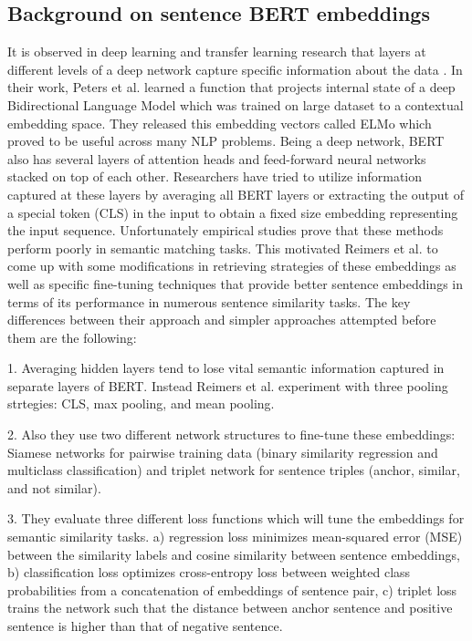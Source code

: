 \subsection{Background on sentence BERT embeddings}
It is observed in deep learning and transfer learning research that layers at different levels of a deep network capture specific information about the data \cite{peters2018dissecting}. In their work, Peters et al. \cite{peters2018deep} learned a function that projects internal state of a deep Bidirectional Language Model which was trained on large dataset to a contextual embedding space. They released this embedding vectors called ELMo which proved to be useful across many NLP problems. Being a deep network, BERT \cite{devlin2018bert} also has several layers of attention heads and feed-forward neural networks stacked on top of each other. Researchers have tried to utilize information captured at these layers by averaging all BERT layers \cite{zhang2019bertscore} or extracting the output of a special token (CLS) in the input \cite{may2019measuring}\cite{qiao2019understanding} to obtain a fixed size embedding representing the input sequence. Unfortunately empirical studies prove that these methods perform poorly in semantic matching tasks. This motivated Reimers et al. \cite{reimers2019sentence} to come up with some modifications in retrieving strategies of these embeddings as well as specific fine-tuning techniques that provide better sentence embeddings in terms of its performance in numerous sentence similarity tasks. The key differences between their approach and simpler approaches attempted before them are the following:

1. Averaging hidden layers tend to lose vital semantic information captured in separate layers of BERT. Instead Reimers et al. experiment with three pooling strtegies: CLS, max pooling, and mean pooling. 

2. Also they use two different network structures to fine-tune these embeddings: Siamese networks for pairwise training data (binary similarity regression and multiclass classification) and triplet network for sentence triples (anchor, similar, and not similar).

3. They evaluate three different loss functions which will tune the embeddings for semantic similarity tasks. a) regression loss minimizes mean-squared error (MSE) between the similarity labels and cosine similarity between sentence embeddings, b) classification loss optimizes cross-entropy loss between weighted class probabilities from a concatenation of embeddings of sentence pair, c) triplet loss trains the network such that the distance between anchor sentence and positive sentence is higher than that of negative sentence.

